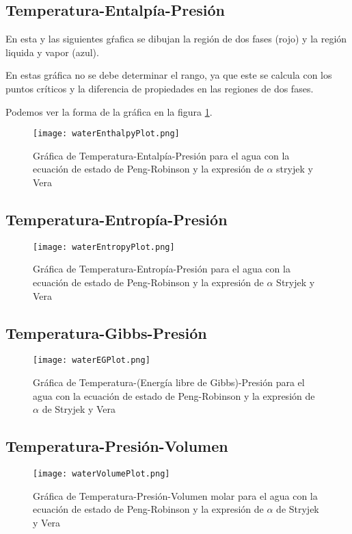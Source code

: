 	\subsection{Temperatura-Entalpía-Presión}\label{subsec:tep}

		En esta y las siguientes gŕafica se dibujan la región de dos fases (rojo) y la región liquida y vapor (azul).

		En estas gráfica no se debe determinar el rango, ya que este se calcula con los puntos críticos y la diferencia de propiedades en las regiones de dos fases. 


		Podemos ver la forma de la gráfica en la figura \ref{fig:hplot}.

		\begin{figure}[!h]
			\texttt{[image: waterEnthalpyPlot.png]}
			\caption{Gráfica de Temperatura-Entalpía-Presión para el agua con la ecuación de estado de Peng-Robinson y la expresión de $\alpha$ stryjek y Vera}
			\label{fig:hplot}
		\end{figure}
	\subsection{Temperatura-Entropía-Presión}\label{subsec:tsp}	
		\begin{figure}[!h]
			\texttt{[image: waterEntropyPlot.png]}
			\caption{Gráfica de Temperatura-Entropía-Presión para el agua con la ecuación de estado de Peng-Robinson y la expresión de $\alpha$ Stryjek y Vera}
			\label{fig:splot}
		\end{figure}
	\subsection{Temperatura-Gibbs-Presión}\label{subsec:tgp}
		\begin{figure}[!h]
			\texttt{[image: waterEGPlot.png]}
			\caption{Gráfica de Temperatura-(Energía libre de Gibbs)-Presión para el agua con la ecuación de estado de Peng-Robinson y la expresión de $\alpha$ de Stryjek y Vera}
			\label{gplot}
		\end{figure}
	\subsection{Temperatura-Presión-Volumen}\label{subsec:tpv}
		\begin{figure}[!h]
			\texttt{[image: waterVolumePlot.png]}
			\caption{Gráfica de Temperatura-Presión-Volumen molar para el agua con la ecuación de estado de Peng-Robinson y la expresión de $\alpha$ de Stryjek y Vera}
			\label{vplot}
		\end{figure}
	
